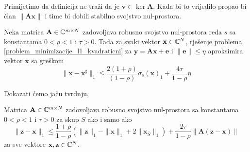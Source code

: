 \documentclass[a4paper,twoside,12pt]{memoir} %
\newcommand{\vect}[1]{\mathbf{#1}}
\renewcommand{\vec}{\vect}
\newcommand{\norm}[1]{\|{#1}\|}
\begin{document}
\noindent
Primijetimo da definicija ne tra\v{z}i da je $\vec v \in \ker \vec A$. Kada bi to vrijedilo propao bi \v{c}lan $\norm{\vec{Ax}}$ i time bi dobili stabilno svojstvo nul-prostora. 
\begin{thm}
    Neka matrica $\vec A \in \C^{m \times N}$ zadovoljava robusno svojstvo nul-prostora reda $s$ sa konstantama $0<\rho<1$ i $\tau > 0$. Tada za svaki vektor $\vec x \in \C^N$, rje\v{s}enje problema \eqref{problem_minimizacije_l1_kvadraticni} za $\vec y = \vec{Ax}+\vec{e}$ i $\norm{\vec e} \leq \eta$ aproksimira vektor $\vec x$ sa gre\v{s}kom
    \begin{equation*}
        \norm{\vec x - \vec x^{\sharp}}_1 \leq \frac{2(1+\rho)}{(1-\rho)} \sigma_s(\vec x)_1 + \frac{4 \tau}{1-\rho}\eta 
    \end{equation*}
\end{thm}
Dokazati \'cemo ja\v{c}u tvrdnju,
\begin{thm}\label{tm:4:20}
    Matrica $\vec A \in \C^{m \times N}$ zadovoljava robusno svojstvo nul-prostora sa konstantama $0<\rho<1$ i $\tau > 0$ za skup $S$ ako i samo ako
    \begin{equation}\label{robusno_tm2_nejed}
        \norm{\vec z - \vec x}_1 \leq \frac{1+\rho}{1-\rho} (\norm{\vec z}_1 - \norm{\vec x}_1 + 2 \norm{\vec x_{\bar S}}_1) + \frac{2 \tau}{1 - \rho} \norm{\vec A (\vec z - \vec x)}  
    \end{equation}
    za sve vektore $\vec x, \vec z \in \C^N$.
\end{thm}
\end{document}
